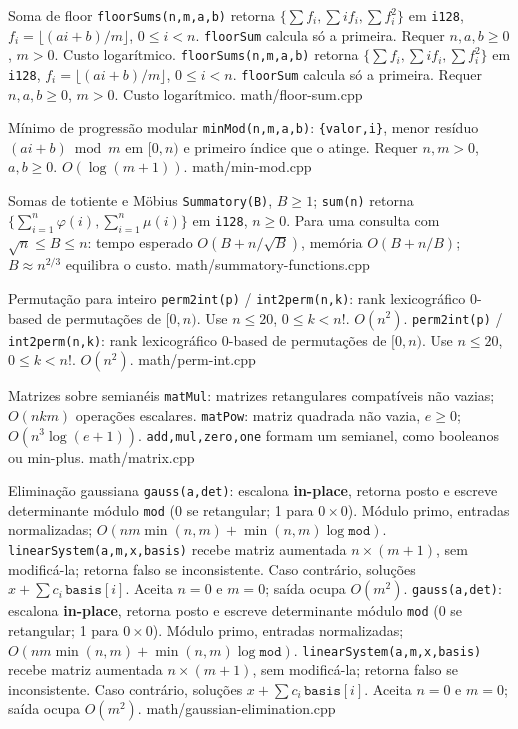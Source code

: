 \templateentry
{Soma de floor}
{\texttt{floorSums(n,m,a,b)} retorna $\{\sum f_i,\sum i f_i,\sum f_i^2\}$ em \texttt{i128}, $f_i=\lfloor(ai+b)/m\rfloor$, $0\le i<n$. \texttt{floorSum} calcula só a primeira. Requer $n,a,b\ge0$, $m>0$. Custo logarítmico.}
{\texttt{floorSums(n,m,a,b)} retorna $\{\sum f_i,\sum i f_i,\sum f_i^2\}$ em \texttt{i128}, $f_i=\lfloor(ai+b)/m\rfloor$, $0\le i<n$. \texttt{floorSum} calcula só a primeira. Requer $n,a,b\ge0$, $m>0$. Custo logarítmico.}
{math/floor-sum.cpp}

\ifextended

\templateentry
{Mínimo de progressão modular}
{}
{\texttt{minMod(n,m,a,b)}: \texttt{\{valor,i\}}, menor resíduo $(ai+b)\bmod m$ em $[0,n)$ e primeiro índice que o atinge. Requer $n,m>0$, $a,b\ge0$. $O(\log(m+1))$.}
{math/min-mod.cpp}

\templateentry
{Somas de totiente e Möbius}
{}
{\texttt{Summatory(B)}, $B\ge1$; \texttt{sum(n)} retorna $\{\sum_{i=1}^n\varphi(i),\sum_{i=1}^n\mu(i)\}$ em \texttt{i128}, $n\ge0$. Para uma consulta com $\sqrt n\le B\le n$: tempo esperado $O(B+n/\sqrt B)$, memória $O(B+n/B)$; $B\approx n^{2/3}$ equilibra o custo.}
{math/summatory-functions.cpp}

\templateentry
{Permutação para inteiro}
{\texttt{perm2int(p)} / \texttt{int2perm(n,k)}: rank lexicográfico 0-based de permutações de $[0,n)$. Use $n\le20$, $0\le k<n!$. $O(n^2)$.}
{\texttt{perm2int(p)} / \texttt{int2perm(n,k)}: rank lexicográfico 0-based de permutações de $[0,n)$. Use $n\le20$, $0\le k<n!$. $O(n^2)$.}
{math/perm-int.cpp}

\templateentry
{Matrizes sobre semianéis}
{}
{\texttt{matMul}: matrizes retangulares compatíveis não vazias; $O(nkm)$ operações escalares. \texttt{matPow}: matriz quadrada não vazia, $e\ge0$; $O(n^3\log(e+1))$. \texttt{add,mul,zero,one} formam um semianel, como booleanos ou min-plus.}
{math/matrix.cpp}

\fi

\templateentry
{Eliminação gaussiana}
{\texttt{gauss(a,det)}: escalona \textbf{in-place}, retorna posto e escreve determinante módulo \texttt{mod} (0 se retangular; 1 para $0\times0$). Módulo primo, entradas normalizadas; $O(nm\min(n,m)+\min(n,m)\log \mathtt{mod})$. \texttt{linearSystem(a,m,x,basis)} recebe matriz aumentada $n\times(m+1)$, sem modificá-la; retorna falso se inconsistente. Caso contrário, soluções $x+\sum c_i\,\mathtt{basis}[i]$. Aceita $n=0$ e $m=0$; saída ocupa $O(m^2)$.}
{\texttt{gauss(a,det)}: escalona \textbf{in-place}, retorna posto e escreve determinante módulo \texttt{mod} (0 se retangular; 1 para $0\times0$). Módulo primo, entradas normalizadas; $O(nm\min(n,m)+\min(n,m)\log \mathtt{mod})$. \texttt{linearSystem(a,m,x,basis)} recebe matriz aumentada $n\times(m+1)$, sem modificá-la; retorna falso se inconsistente. Caso contrário, soluções $x+\sum c_i\,\mathtt{basis}[i]$. Aceita $n=0$ e $m=0$; saída ocupa $O(m^2)$.}
{math/gaussian-elimination.cpp}

